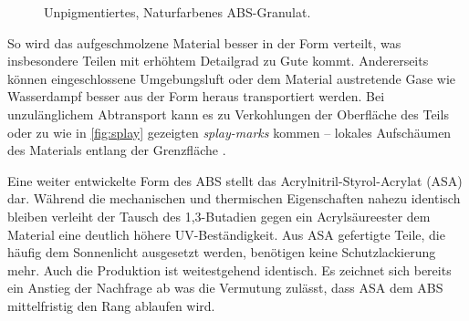         \begin{figure}%
            \centering
            \vspace{-.8\baselineskip}
            \caption[Unpigmentiertes, Naturfarbenes ABS-Granulat]{Unpigmentiertes, Naturfarbenes ABS-Granulat.}%
            \label{fig:virgin ABS}%
        \end{figure}
        So wird das aufgeschmolzene Material besser in der Form verteilt, was insbesondere Teilen mit erhöhtem
        Detailgrad zu Gute kommt. Andererseits können eingeschlossene Umgebungsluft oder dem Material austretende Gase wie
        Wasserdampf besser aus der Form heraus transportiert werden. Bei unzulänglichem Abtransport kann es zu Verkohlungen
        der Oberfläche des Teils oder zu wie in \cref{fig:splay} gezeigten \textit{splay-marks} kommen – lokales Aufschäumen des
        Materials entlang der Grenzfläche \cite{influence.of.additives.on.flow.behavior.Blyler.1974,effects.on.ABS.by.Additives.for.3Dprinting.Torrado.2015}.
        
        Eine weiter entwickelte Form des ABS stellt das Acrylnitril-Styrol-Acrylat (ASA) dar. Während die mechanischen und
        thermischen Eigenschaften nahezu identisch bleiben verleiht der Tausch des 1,3-Butadien gegen ein Acrylsäureester
        dem Material eine deutlich höhere UV-Beständigkeit. Aus ASA gefertigte Teile, die häufig dem Sonnenlicht ausgesetzt
        werden, benötigen keine Schutzlackierung mehr. Auch die Produktion ist weitestgehend identisch. Es zeichnet sich
        bereits ein Anstieg der Nachfrage ab was die Vermutung zulässt, dass ASA dem ABS mittelfristig den Rang ablaufen wird.
        
